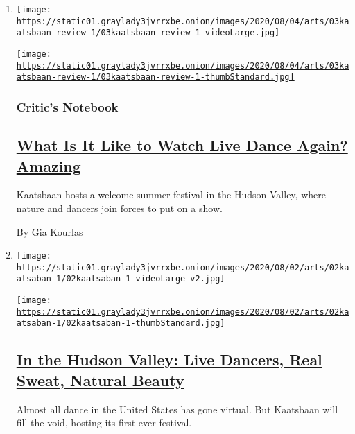 \begin{enumerate}
\def\labelenumi{\arabic{enumi}.}
\item
  \texttt{[image: https://static01.graylady3jvrrxbe.onion/images/2020/08/04/arts/03kaatsbaan-review-1/03kaatsbaan-review-1-videoLarge.jpg]}

  \href{/2020/08/03/arts/dance/kaatsbaan-dance.html}{\texttt{[image: https://static01.graylady3jvrrxbe.onion/images/2020/08/04/arts/03kaatsbaan-review-1/03kaatsbaan-review-1-thumbStandard.jpg]}}

  \hypertarget{critics-notebook}{%
  \subsubsection{Critic's Notebook}\label{critics-notebook}}

  \hypertarget{what-is-it-like-to-watch-live-dance-again-amazing}{%
  \subsection{\texorpdfstring{\href{/2020/08/03/arts/dance/kaatsbaan-dance.html}{What
  Is It Like to Watch Live Dance Again?
  Amazing}}{What Is It Like to Watch Live Dance Again? Amazing}}\label{what-is-it-like-to-watch-live-dance-again-amazing}}

  Kaatsbaan hosts a welcome summer festival in the Hudson Valley, where
  nature and dancers join forces to put on a show.

  By Gia Kourlas
\item
  \texttt{[image: https://static01.graylady3jvrrxbe.onion/images/2020/08/02/arts/02kaatsaban-1/02kaatsaban-1-videoLarge-v2.jpg]}

  \href{/2020/07/29/arts/dance/kaatsbaan-dance-festival-stella-abrera.html}{\texttt{[image: https://static01.graylady3jvrrxbe.onion/images/2020/08/02/arts/02kaatsaban-1/02kaatsaban-1-thumbStandard.jpg]}}

  \hypertarget{in-the-hudson-valley-live-dancers-real-sweat-natural-beauty}{%
  \subsection{\texorpdfstring{\href{/2020/07/29/arts/dance/kaatsbaan-dance-festival-stella-abrera.html}{In
  the Hudson Valley: Live Dancers, Real Sweat, Natural
  Beauty}}{In the Hudson Valley: Live Dancers, Real Sweat, Natural Beauty}}\label{in-the-hudson-valley-live-dancers-real-sweat-natural-beauty}}

  Almost all dance in the United States has gone virtual. But Kaatsbaan
  will fill the void, hosting its first-ever festival.


\end{enumerate}
